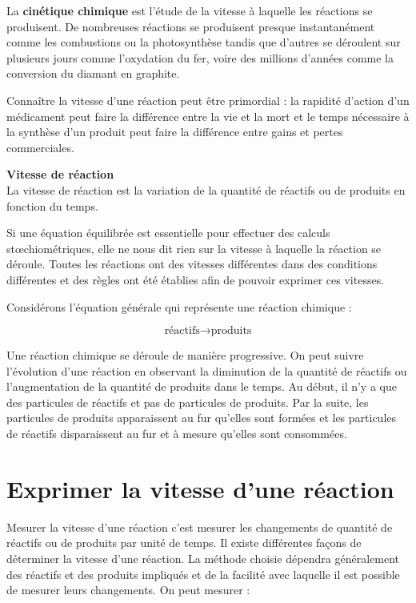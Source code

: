 \documentclass[
  11pt,
  french,
  a4paper,
  openany]{book}
\begin{document}
La \textbf{cinétique chimique} est l'étude de la vitesse à laquelle les réactions se produisent. De nombreuses réactions se produisent presque instantanément comme les combustions ou la photosynthèse tandis que d'autres se déroulent sur plusieurs jours comme l'oxydation du fer, voire des millions d'années comme la conversion du diamant en graphite.

Connaître la vitesse d'une réaction peut être primordial : la rapidité d'action d'un médicament peut faire la différence entre la vie et la mort et le temps nécessaire à la synthèse d'un produit peut faire la différence entre gains et pertes commerciales.

\begin{tcolorbox}
\textbf{Vitesse de réaction}\\
La vitesse de réaction est la variation de la quantité de réactifs ou de produits en fonction du temps.

\end{tcolorbox}

Si une équation équilibrée est essentielle pour effectuer des calculs stœchiométriques, elle ne nous dit rien sur la vitesse à laquelle la réaction se déroule. Toutes les réactions ont des vitesses différentes dans des conditions différentes et des règles ont été établies afin de pouvoir exprimer ces vitesses.

Considérons l'équation générale qui représente une réaction chimique :

\[
\text{réactifs} \rightarrow \text{produits}
\]

Une réaction chimique se déroule de manière progressive. On peut suivre l'évolution d'une réaction en observant la diminution de la quantité de réactifs ou l'augmentation de la quantité de produits dans le temps. Au début, il n'y a que des particules de réactifs et pas de particules de produits. Par la suite, les particules de produits apparaissent au fur qu'elles sont formées et les particules de réactifs disparaissent au fur et à mesure qu'elles sont consommées.

\hypertarget{exprimer-la-vitesse-dune-ruxe9action}{%
\section{Exprimer la vitesse d'une réaction}\label{exprimer-la-vitesse-dune-ruxe9action}}

Mesurer la vitesse d'une réaction c'est mesurer les changements de quantité de réactifs ou de produits par unité de temps. Il existe différentes façons de déterminer la vitesse d'une réaction. La méthode choisie dépendra généralement des réactifs et des produits impliqués et de la facilité avec laquelle il est possible de mesurer leurs changements. On peut mesurer :
\end{document}
